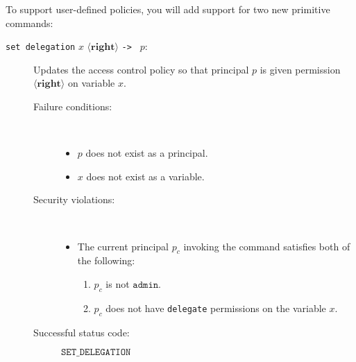 \documentclass[11pt]{article}
\begin{document}
To support user-defined policies, you will add support for two new primitive commands:
\begin{description}
\item[\texttt{set delegation} $x$ $\langle\mathbf{right}\rangle$ \texttt{->\ } $p$:] Updates the access control policy so that principal $p$ is given permission $\langle\mathbf{right}\rangle$ on variable $x$.
\begin{description}
\item[Failure conditions:]\ \\[-1.5em]
\begin{itemize}
\item $p$ does not exist as a principal.
\item $x$ does not exist as a variable.
\end{itemize}
\item[Security violations:]\ \\[-1.5em]
\begin{itemize}
\item The current principal $p_c$ invoking the command satisfies {\color{red} both} of the following:
\begin{enumerate} 
\item $p_c$ is not $\mathtt{admin}$.
\item $p_c$ does not have \texttt{delegate} permissions on the variable $x$.
\end{enumerate}
\end{itemize}
\item[Successful status code:] $\mathtt{SET\_DELEGATION}$
\end{description}


\end{description}
\end{document}
